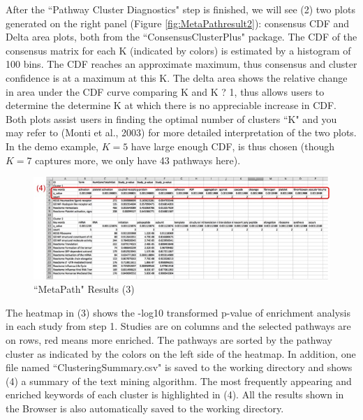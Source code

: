 After the ``Pathway Cluster Diagnostics" step is finished, we will see (2) two plots generated on the right panel (Figure \ref{fig:MetaPathresult2}): consensus CDF and Delta area plots, both from the ``ConsensusClusterPlus" package. The CDF of the consensus matrix for each K (indicated by colors) is estimated by a histogram of 100 bins. The CDF
reaches an approximate maximum, thus consensus and cluster confidence is at a maximum at this K. The delta area shows the relative change in area under the CDF curve comparing K and K ? 1, thus allows users to determine the determine K at which there is no appreciable increase in CDF. Both plots assist users in finding the optimal number of clusters ``K" and you may refer to (Monti et al., 2003) for more detailed interpretation of the two plots. In the demo example, $K=5$ have large enough CDF, is thus chosen (though $K=7$ captures more, we only have 43 pathways here). 

\begin{figure}[H]
\begin{center}
\includegraphics[scale=0.45]{./figure/metaPath/metaPathresult3.jpg}
\caption{``MetaPath" Results (3)}
\label{fig:MetaPathresult3}
\end{center}
\end{figure}

The heatmap in (3) shows the -log10 transformed p-value of enrichment analysis in each study from step 1. Studies are on columns and the selected pathways are on rows, red means more enriched. The pathways are sorted by the pathway cluster as indicated by the colors on the left side of the heatmap. In addition, one file named ``Clustering\textunderscore Summary.csv" is saved to the working directory and shows (4) a summary of the text mining algorithm. The most frequently appearing and enriched keywords of each cluster is highlighted in (4). All the results shown in the Browser is also automatically saved to the working directory.

